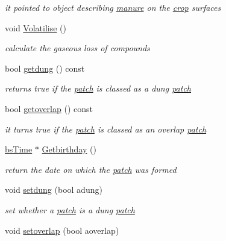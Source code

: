 \begin{DoxyCompactItemize}
\begin{DoxyCompactList}\small\item\em it pointed to object describing \hyperlink{classmanure}{manure} on the \hyperlink{classcrop}{crop} surfaces \item\end{DoxyCompactList}\item 
void \hyperlink{classpatch_a0fdda2c18cd319101078a5de170f19cb}{Volatilise} ()
\begin{DoxyCompactList}\small\item\em calculate the gaseous loss of compounds \item\end{DoxyCompactList}\item 
bool \hyperlink{classpatch_a279fb0c6870f98e0f391bb045a20628d}{getdung} () const 
\begin{DoxyCompactList}\small\item\em returns true if the \hyperlink{classpatch}{patch} is classed as a dung \hyperlink{classpatch}{patch} \item\end{DoxyCompactList}\item 
bool \hyperlink{classpatch_aeb73d687a6349a34695f19b4613008eb}{getoverlap} () const 
\begin{DoxyCompactList}\small\item\em it turns true if the \hyperlink{classpatch}{patch} is classed as an overlap \hyperlink{classpatch}{patch} \item\end{DoxyCompactList}\item 
\hyperlink{classbs_time}{bsTime} $\ast$ \hyperlink{classpatch_a7093fdf2689a46a666762bb73803aadf}{Getbirthday} ()
\begin{DoxyCompactList}\small\item\em return the date on which the \hyperlink{classpatch}{patch} was formed \item\end{DoxyCompactList}\item 
void \hyperlink{classpatch_a64bb8ae35378455255ca5a1b546d70d1}{setdung} (bool adung)
\begin{DoxyCompactList}\small\item\em set whether a \hyperlink{classpatch}{patch} is a dung \hyperlink{classpatch}{patch} \item\end{DoxyCompactList}\item 
void \hyperlink{classpatch_abceaced850ecf5b133c4e74b70f12d54}{setoverlap} (bool aoverlap)

\end{DoxyCompactItemize}

